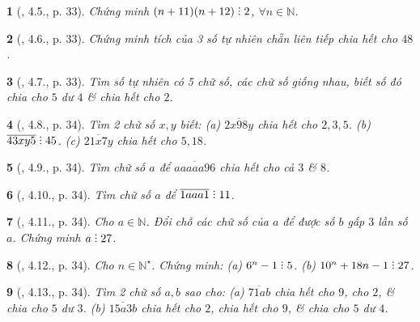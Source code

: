 \documentclass{article}
\newtheorem{baitoan}{}
\DeclareRobustCommand{\divby}{%
	\mathrel{\vbox{\baselineskip.65ex\lineskiplimit0pt\hbox{.}\hbox{.}\hbox{.}}}%
}
\begin{document}
\begin{baitoan}[\cite{Binh_boi_duong_Toan_6_tap_1}, 4.5., p. 33]
	Chứng minh $(n + 11)(n + 12)\divby2$, $\forall n\in\mathbb{N}$.
\end{baitoan}

\begin{baitoan}[\cite{Binh_boi_duong_Toan_6_tap_1}, 4.6., p. 33]
	Chứng minh tích của 3 số tự nhiên chẵn liên tiếp chia hết cho $48$.
\end{baitoan}

\begin{baitoan}[\cite{Binh_boi_duong_Toan_6_tap_1}, 4.7., p. 33]
	Tìm số tự nhiên có 5 chữ số, các chữ số giống nhau, biết số đó chia cho $5$ dư $4$ \& chia hết cho $2$.
\end{baitoan}

\begin{baitoan}[\cite{Binh_boi_duong_Toan_6_tap_1}, 4.8., p. 34]
	Tìm 2 chữ số $x,y$ biết: (a) $\overline{2x98y}$ chia hết cho $2,3,5$. (b) $\overline{43xy5}\divby45$. (c) $\overline{21x7y}$ chia hết cho $5,18$.
\end{baitoan}

\begin{baitoan}[\cite{Binh_boi_duong_Toan_6_tap_1}, 4.9., p. 34]
	Tìm chữ số $a$ để $\overline{aaaaa96}$ chia hết cho cả $3$ \& $8$.
\end{baitoan}

\begin{baitoan}[\cite{Binh_boi_duong_Toan_6_tap_1}, 4.10., p. 34]
	Tìm chữ số $a$ để $\overline{1aaa1}\divby11$.
\end{baitoan}

\begin{baitoan}[\cite{Binh_boi_duong_Toan_6_tap_1}, 4.11., p. 34]
	Cho $a\in\mathbb{N}$. Đổi chỗ các chữ số của $a$ để được số $b$ gấp $3$ lần số $a$. Chứng minh $a\divby27$.
\end{baitoan}

\begin{baitoan}[\cite{Binh_boi_duong_Toan_6_tap_1}, 4.12., p. 34]
	Cho $n\in\mathbb{N}^\star$. Chứng minh: (a) $6^n - 1\divby5$. (b) $10^n + 18n - 1\divby27$.
\end{baitoan}

\begin{baitoan}[\cite{Binh_boi_duong_Toan_6_tap_1}, 4.13., p. 34]
	Tìm 2 chữ số $a,b$ sao cho: (a) $\overline{71ab}$ chia hết cho $9$, cho $2$, \& chia cho $5$ dư $3$. (b) $\overline{15a3b}$ chia hết cho $2$, chia hết cho $9$, \& chia cho $5$ dư $4$.
\end{baitoan}
\end{document}
